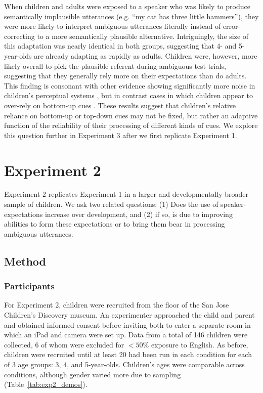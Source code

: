 \documentclass[man,floatsintext]{apa6}
\begin{document}
When children and adults were exposed to a speaker who was likely to produce semantically implausible utterances (e.g. ``my cat has three little hammers''), they were more likely to interpret ambiguous utterances literally instead of error-correcting to a more semantically plausible alternative. Intriguingly, the size of this adaptation was nearly identical in both groups, suggesting that 4- and 5-year-olds are already adapting as rapidly as adults. Children were, however, more likely overall to pick the plausible referent during ambiguous test trials, suggesting that they generally rely more on their expectations than do adults. This finding is consonant with other evidence showing significantly more noise in children's perceptual systems \cite{neuman1983}, but in contrast cases in which children appear to over-rely on bottom-up cues \cite{snedeker2004, trueswell1999}. These results suggest that children's relative reliance on bottom-up or top-down cues may not be fixed, but rather an adaptive function of the reliability of their processing of different kinds of cues. We explore this question further in Experiment 3 after we first replicate Experiment 1.  

\section{Experiment 2}

Experiment 2 replicates Experiment 1 in a larger and developmentally-broader sample of children. We ask two related questions: (1) Does the use of speaker-expectations increase over development, and (2) if so, is due to improving abilities to form these expectations or to bring them bear in processing ambiguous utterances.  

\subsection{Method}

\subsubsection{Participants}

For Experiment 2, children were recruited from the floor of the San Jose Children's Discovery museum. An experimenter approached the child and parent and obtained informed consent before inviting both to enter a separate room in which an iPad and camera were set up. Data from a total of 146 children were collected, 6 of whom were excluded for $<50\%$ exposure to English. As before, children were recruited until at least 20 had been run in each condition for each of 3 age groups: 3, 4, and 5-year-olds. Children's ages were comparable across conditions, although gender varied more due to sampling (Table~\ref{tab:exp2_demos}).
\end{document}
